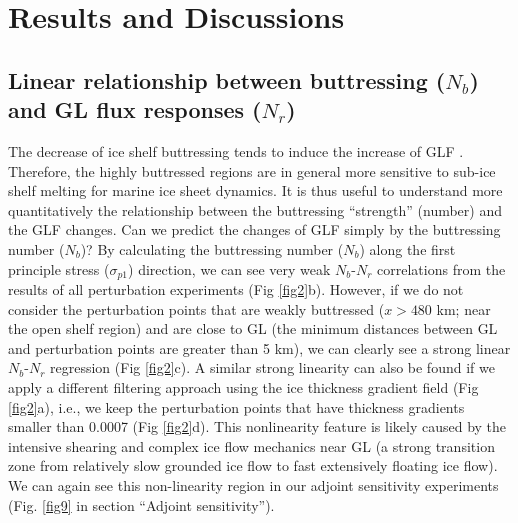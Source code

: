 \documentclass[review,oneside]{igs}
\begin{document}
%

\section{Results and Discussions}
\subsection{Linear relationship between buttressing ($N_b$) and GL flux responses ($N_r$)}
The decrease of ice shelf buttressing tends to induce the increase of GLF \citep{gagliardini2010}. Therefore, the highly buttressed regions are in general more sensitive to sub-ice shelf melting for  marine ice sheet dynamics. It is thus useful to understand more quantitatively the relationship between the buttressing ``strength'' (number) and the GLF  changes. Can we predict the changes of GLF simply by the buttressing number ($N_b$)? By calculating the buttressing number ($N_b$) along the first principle stress ($\sigma_{p1}$) direction, we can see very weak $N_b$-$N_r$ correlations from the results of all perturbation experiments (Fig \ref{fig2}b). However, if we do not consider the perturbation points that are weakly buttressed ($x>480$ km; near the open shelf region) and are close to GL (the minimum distances between GL and perturbation points are greater than 5 km), we can clearly see a strong linear $N_b$-$N_r$ regression (Fig \ref{fig2}c). A similar strong linearity can also be found if we apply a different filtering approach using the ice thickness gradient field (Fig \ref{fig2}a), i.e., we keep the perturbation points that have thickness gradients smaller than 0.0007 (Fig \ref{fig2}d). This nonlinearity feature is likely caused by the intensive shearing and complex ice flow mechanics near GL (a strong transition zone from relatively slow grounded ice flow to fast extensively floating ice flow). We can again see this non-linearity region in our adjoint sensitivity experiments (Fig. \ref{fig9} in section ``Adjoint sensitivity'').
\end{document}
